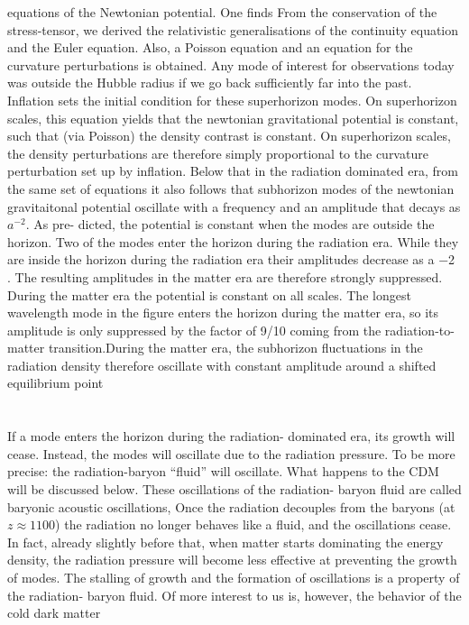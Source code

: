 \begin{description}
equations of the Newtonian potential. One finds From the conservation of the stress-tensor, we derived the relativistic generalisations of
the continuity equation and the Euler equation. Also, a Poisson equation and an equation for the curvature perturbations is obtained. Any mode of interest for observations today was outside the Hubble radius if we go back sufficiently far into the past. Inflation sets the initial condition for these superhorizon modes.
On superhorizon scales, this equation yields that the newtonian gravitational potential is constant, such that (via Poisson) the density contrast is constant.
On superhorizon scales, the density perturbations are therefore simply proportional to the curvature
perturbation set up by inflation.
Below that in the radiation dominated era, from the same set of equations it also follows that subhorizon modes of the newtonian gravitaitonal potential oscillate with a frequency and an amplitude that decays as $a^{−2}$.
As pre-
dicted, the potential is constant when the modes are outside the horizon. Two of the modes enter
the horizon during the radiation era. While they are inside the horizon during the radiation
era their amplitudes decrease as a −2 . The resulting amplitudes in the matter era are therefore
strongly suppressed. During the matter era the potential is constant on all scales. The longest
wavelength mode in the figure enters the horizon during the matter era, so its amplitude is only suppressed by the factor of 9/10 coming from the radiation-to-matter transition.During the
matter era, the subhorizon fluctuations in the radiation density therefore oscillate with constant
amplitude around a shifted equilibrium point\\
\\
\\
If a mode enters the horizon during the radiation-
dominated era, its growth will cease. Instead, the modes will oscillate due to the
radiation pressure. To be more precise: the radiation-baryon “fluid” will oscillate.
What happens to the CDM will be discussed below. These oscillations of the radiation-
baryon fluid are called baryonic acoustic oscillations,
Once the radiation decouples from the baryons (at$z \approx 1100$) the radiation no longer
behaves like a fluid, and the oscillations cease. In fact, already slightly before that,
when matter starts dominating the energy density, the radiation pressure will become
less effective at preventing the growth of modes.
The stalling of growth and the formation of oscillations is a property of the radiation-
baryon fluid. Of more interest to us is, however, the behavior of the cold dark matter

\end{description}
